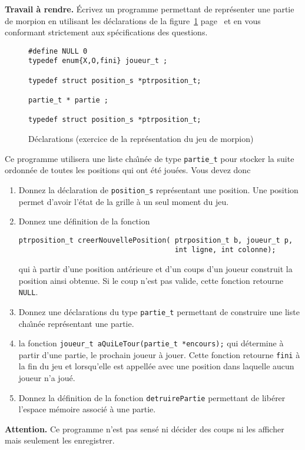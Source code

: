 \par\medskip\noindent\textbf{Travail \`a rendre.}  \'Ecrivez un
programme permettant de repr\'esenter une partie de morpion en
utilisant les d\'eclarations de la figure~\ref{fig:declaration}
page~\pageref{fig:declaration} et en vous conformant strictement aux
sp\'ecifications des questions.
\begin{figure}[htbp]
  \centering
\begin{verbatim}
#define NULL 0
typedef enum{X,O,fini} joueur_t ; 

typedef struct position_s *ptrposition_t;

partie_t * partie ;

typedef struct position_s *ptrposition_t;
\end{verbatim}
  \caption{D\'eclarations (exercice de la repr\'esentation du jeu de morpion)}
  \label{fig:declaration}
\end{figure}
Ce programme utilisera une liste cha\^\i{}n\'ee de type
\verb+partie_t+ pour stocker la suite ordonn\'ee de toutes les
positions qui ont \'et\'e jou\'ees. Vous devez donc
\begin{enumerate}
\item Donnez la d\'eclaration de \verb+position_s+ repr\'esentant une
  position. Une position permet d'avoir l'\'etat de la grille \`a un
  seul moment du jeu.
\item Donnez une d\'efinition de la fonction
\begin{verbatim}
ptrposition_t creerNouvellePosition( ptrposition_t b, joueur_t p, 
                                     int ligne, int colonne);
\end{verbatim}
  qui \`a partir d'une position ant\'erieure et d'un coups d'un joueur
  construit la position ainsi obtenue. Si le coup n'est pas valide,
  cette fonction retourne \verb+NULL+.
\item Donnez une d\'eclarations du type \verb+partie_t+ permettant de
  construire une liste cha\^\i{}n\'ee repr\'esentant une partie.
\item la fonction %
  \verb+joueur_t aQuiLeTour(partie_t *encours);+%
  qui d\'etermine \`a partir d'une partie, le prochain joueur \`a
  jouer. Cette fonction retourne \verb+fini+ \`a la fin du jeu et
  lorsqu'elle est appell\'ee avec une position dans laquelle aucun
  joueur n'a jou\'e.
\item Donnez la d\'efinition de la fonction \verb+detruirePartie+
  permettant de lib\'erer l'espace m\'emoire associ\'e \`a une partie.
\end{enumerate}

\par\medskip\noindent\textbf{Attention.}
Ce programme n'est pas sens\'e ni d\'ecider des coups ni les afficher 
mais seulement les enregistrer.
